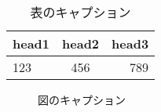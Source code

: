 \begin{table}[htb]
    \caption{表のキャプション}
    \centering
    \begin{tabular}{lcr}
        \hline
        head1 & head2 & head3 \\ 
        \hline\hline
        123 & 456 & 789\\
        \hline
    \end{tabular}
    \label{tab:my_label}
\end{table}

\begin{figure}
    \centering
    \caption{図のキャプション}
    \label{fig:my_label}
\end{figure}
